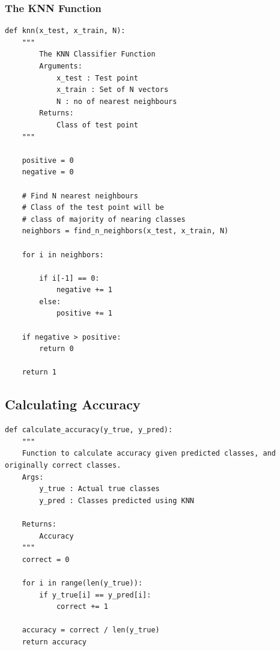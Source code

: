 \documentclass[letterpaper, 28pt, fleqn]{article}
\begin{document}
\pagebreak

\subsubsection{The KNN Function}

\begin{lstlisting}
def knn(x_test, x_train, N):
    """
        The KNN Classifier Function
        Arguments:
            x_test : Test point
            x_train : Set of N vectors
            N : no of nearest neighbours
        Returns:
            Class of test point   
    """
    
    positive = 0
    negative = 0

    # Find N nearest neighbours
    # Class of the test point will be
    # class of majority of nearing classes
    neighbors = find_n_neighbors(x_test, x_train, N)
    
    for i in neighbors:
        
        if i[-1] == 0:
            negative += 1
        else:
            positive += 1
        
    if negative > positive:
        return 0
    
    return 1
\end{lstlisting}

\subsection{Calculating Accuracy}

\begin{lstlisting}
def calculate_accuracy(y_true, y_pred):
    """
    Function to calculate accuracy given predicted classes, and originally correct classes.
    Args:
        y_true : Actual true classes
        y_pred : Classes predicted using KNN 
        
    Returns:
        Accuracy 
    """
    correct = 0
    
    for i in range(len(y_true)):
        if y_true[i] == y_pred[i]:
            correct += 1
            
    accuracy = correct / len(y_true)
    return accuracy
\end{lstlisting}
\end{document}
